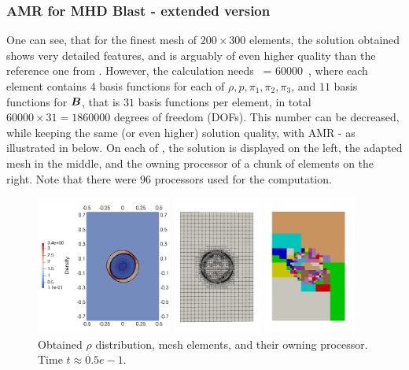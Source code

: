 \subsubsection{AMR for MHD Blast - extended version}
One can see, that for the finest mesh of $200\times300$ elements, the solution obtained shows very detailed features, and is arguably of even higher quality than the reference one from \cite{blastNew1}. However, the calculation needs
 \ = 60000\ ,
\ee
where each element contains $4$ basis functions for each of $\rho, p, \pi_1, \pi_2, \pi_3$, and $11$ basis functions for $\mbox{\boldmath $B$}$, that is $31$ basis functions per element, in total $60000 \times 31 = 1860000$ degrees of freedom (DOFs). This number can be decreased, while keeping the same (or even higher) solution quality, with AMR - as illustrated in  below. On each of , the solution is displayed on the left, the adapted mesh in the middle, and the owning processor of a chunk of elements on the right. Note that there were $96$ processors used for the computation.

\begin{figure}[H]
	\begin{center}
		\includegraphics[width=0.95\textwidth]{img/mhd-blast/new/adapt-full0.jpg}
\vspace{-3mm}
	\caption{Obtained $\rho$ distribution, mesh elements, and their owning processor. Time $t\approx 0.5e-1$.}
	\label{figure:amrBlast1}
	\end{center}
\end{figure}
\vspace{-10mm}


